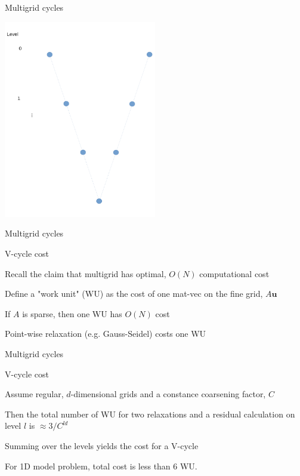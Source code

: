 \documentclass[18pt,xcolor=table]{beamer}
\begin{document}
\begin{frame}{Multigrid cycles}
\begin{center}
\hspace{-1cm}
\includegraphics[width=0.5\textwidth]{../figures/Vcycle}
\end{center}
\end{frame}

\begin{frame}{Multigrid cycles}
\begin{block}{V-cycle cost}
\bit
\item Recall the claim that multigrid has optimal, $O(N)$ computational cost
\item Define a "work unit" (WU) as the cost of one mat-vec on the fine grid, $A\mathbf{u}$
\item If $A$ is sparse, then one WU has $O(N)$ cost
\item Point-wise relaxation (e.g. Gauss-Seidel) costs one WU
\eit
\end{block}
\end{frame}

\begin{frame}{Multigrid cycles}
\begin{block}{V-cycle cost}
\bit
\item Assume regular, $d$-dimensional grids and a constance coarsening factor, $C$
\item Then the total number of WU for two relaxations and a residual calculation on level $l$ is $\approx 3/C^{ld}$
\item Summing over the levels yields the cost for a V-cycle
\item For 1D model problem, total cost is less than 6 WU.
\eit
\end{block}
\end{frame}
\end{document}
